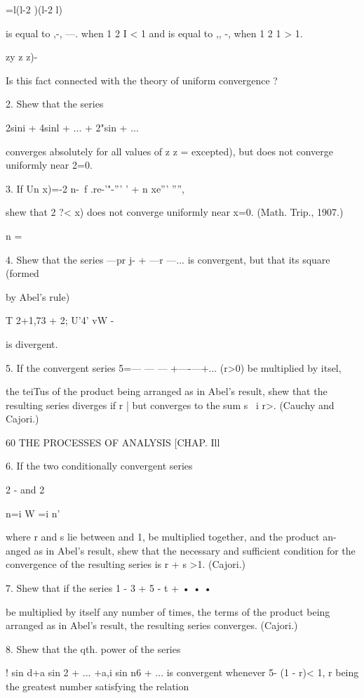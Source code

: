  =l(l-2 )(l-2 l)

is equal to ,-, —. when 1 2 I < 1 and is equal to ,, -, when 1 2 1 >
1.

  zy z z)-

Is this fact connected with the theory of uniform convergence ?

2. Shew that the series

2sini + 4sinl + ... + 2"sin + ...

converges absolutely for all values of z z = excepted), but does not
converge uniformly near 2=0.

3. If Un x)=-2 n-\ f .re-'"-''' ' + n xe''' '''',

shew that 2 ?< x) does not converge uniformly near x=0. (Math. Trip.,
1907.)

n = \

4. Shew that the series —pr j- + —r —... is convergent, but that its
square (formed

by Abel's rule)

T 2+1,73 + 2; U'4' vW -

is divergent.

5. If the convergent series 5=— — — +—-—+... (r>0) be multiplied by
itsel,

the teiTus of the product being arranged as in Abel's result, shew
that the resulting series diverges if r | but converges to the sum s \
i r>. (Cauchy and Cajori.)



60 THE PROCESSES OF ANALYSIS [CHAP. Ill

6. If the two conditionally convergent series

2 - and 2



n=i W =i n'

where r and s lie between and 1, be multiplied together, and the
product an-anged as in Abel's result, shew that the necessary and
sufficient condition for the convergence of the resulting series is r
+ s >1. (Cajori.)

7. Shew that if the series 1 - 3 + 5 - t + • • •

be multiplied by itself any number of times, the terms of the product
being arranged as in Abel's result, the resulting series converges.
(Cajori.)

8. Shew that the qth. power of the series

 ! sin d+a sin 2 + ... +a,i sin n6 + ... is convergent whenever 5- (1
- r)< 1, r being the greatest number satisfying the relation

